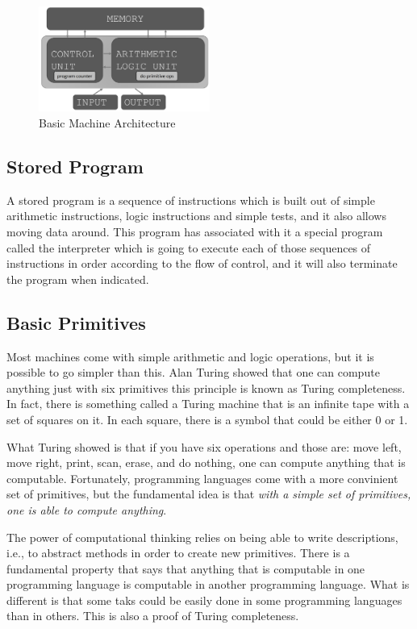 \documentclass[a4paper]{article}
\begin{document}
\begin{figure}[h!]
  \centering
  \includegraphics[width=0.5\textwidth]{machine_architecture.png}
  \caption{Basic Machine Architecture}
\end{figure}

\subsection{Stored Program}

A stored program is a sequence of instructions which is built out of simple
arithmetic instructions, logic instructions and simple tests, and it also
allows moving data around. This program has associated with it a special
program called the interpreter which is going to execute each of those
sequences of instructions in order according to the flow of control, and it
will also terminate the program when indicated.

\subsection{Basic Primitives}

Most machines come with simple arithmetic and logic operations, but it is
possible to go simpler than this. Alan Turing showed that one can compute
anything just with six primitives this principle is known as Turing
completeness. In fact, there is something called a Turing machine that is an
infinite tape with a set of squares on it. In each square, there is a symbol
that could be either 0 or 1.

What Turing showed is that if you have six operations and those are: move left,
move right, print, scan, erase, and do nothing, one can compute anything
that is computable. Fortunately, programming languages come with a more
convinient set of primitives, but the fundamental idea is that
\textit{with a simple set of primitives, one is able to compute anything}.

The power of computational thinking relies on being able to write descriptions,
i.e., to abstract methods in order to create new primitives. There is a
fundamental property that says that anything that is computable in one
programming language is computable in another programming language. What is
different is that some taks could be easily done in some programming languages
than in others. This is also a proof of Turing completeness.
\end{document}
